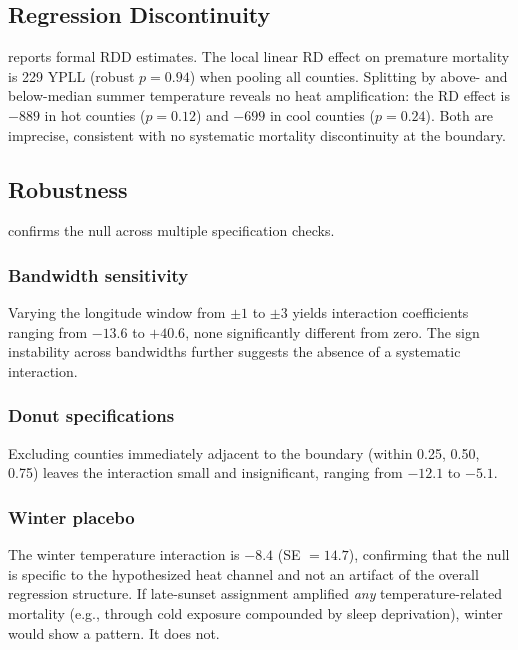 \documentclass[12pt]{article}
\begin{document}
\subsection{Regression Discontinuity}



 reports formal RDD estimates. The local linear RD effect on premature mortality is 229 YPLL (robust $p = 0.94$) when pooling all counties. Splitting by above- and below-median summer temperature reveals no heat amplification: the RD effect is $-889$ in hot counties ($p = 0.12$) and $-699$ in cool counties ($p = 0.24$). Both are imprecise, consistent with no systematic mortality discontinuity at the boundary.

\subsection{Robustness}



 confirms the null across multiple specification checks.

\subsubsection*{Bandwidth sensitivity} Varying the longitude window from $\pm 1$\textdegree{} to $\pm 3$\textdegree{} yields interaction coefficients ranging from $-13.6$ to $+40.6$, none significantly different from zero. The sign instability across bandwidths further suggests the absence of a systematic interaction.

\subsubsection*{Donut specifications} Excluding counties immediately adjacent to the boundary (within 0.25\textdegree{}, 0.50\textdegree{}, 0.75\textdegree{}) leaves the interaction small and insignificant, ranging from $-12.1$ to $-5.1$.

\subsubsection*{Winter placebo} The winter temperature interaction is $-8.4$ (SE $= 14.7$), confirming that the null is specific to the hypothesized heat channel and not an artifact of the overall regression structure. If late-sunset assignment amplified \textit{any} temperature-related mortality (e.g., through cold exposure compounded by sleep deprivation), winter would show a pattern. It does not.
\end{document}
